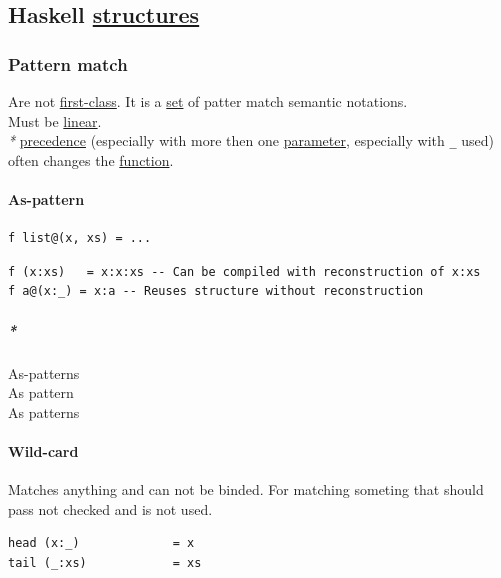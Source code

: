 \documentclass[11pt]{article}
\begin{document}
\subsection{Haskell \hyperref[orgc87c48c]{structures}}
\label{sec:orgdceb9a7}
\subsubsection{\label{org8d84a1a}Pattern match}
\label{sec:orgc382c17}
Are not \hyperref[orgf359a4c]{first-class}. It is a \hyperref[org1faf06d]{set} of patter match semantic notations.\\

Must be \hyperref[orgbbe89e9]{linear}.\\

\emph{*} \hyperref[orgb0d1e87]{precedence} (especially with more then one \hyperref[org0e7674e]{parameter}, especially with \texttt{\_} used) often changes the \hyperref[orge15bc14]{function}.\\

\paragraph{\label{orgd65e5c0}As-pattern}
\label{sec:orgff8c588}
\begin{verbatim}
f list@(x, xs) = ...
\end{verbatim}

\begin{verbatim}
f (x:xs)   = x:x:xs -- Can be compiled with reconstruction of x:xs
f a@(x:_) = x:a -- Reuses structure without reconstruction
\end{verbatim}

\subparagraph{\emph{*}}
\label{sec:org7ed0173}

\label{orgd98116b}As-patterns\\
\label{orgb42cf3c}As pattern\\
\label{org32e5e3b}As patterns\\

\paragraph{\label{orgae8a55e}Wild-card}
\label{sec:orgb6c9e18}
Matches anything and can not be binded. For matching someting that should pass not checked and is not used.\\

\begin{verbatim}
head (x:_)             = x
tail (_:xs)            = xs
\end{verbatim}
\end{document}
